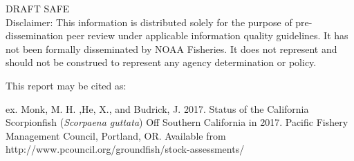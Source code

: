 \begin{center}
\vfill
DRAFT SAFE\\
Disclaimer: This information is distributed solely for the purpose of pre-dissemination
peer review under applicable information quality guidelines. It has not been formally
disseminated by NOAA Fisheries. It does not represent and should not be construed to
represent any agency determination or policy. 

\vspace{.3cm}


\newpage

\begin{flushleft}
This report may be cited as:

ex. Monk, M. H. ,He, X., and Budrick, J. 2017. Status of the California Scorpionfish (\emph{Scorpaena guttata}) Off Southern California in 2017. Pacific Fishery Management Council, Portland, OR. Available from http://www.pcouncil.org/groundfish/stock-assessments/
\end{flushleft}

\maketitle

\setcounter{page}{1}
\end{center}


